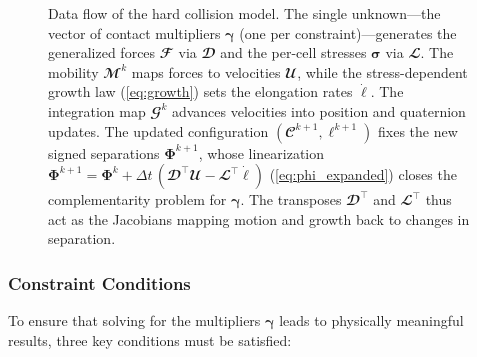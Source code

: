 \documentclass[a4paper,fleqn]{cas-dc}
\begin{document}
\begin{figure}[pos=htbp]
    \caption{Data flow of the hard collision model. The single unknown---the vector of contact multipliers $\boldsymbol{\gamma}$ (one per constraint)---generates the generalized forces $\mathbfcal{F}$ via $\mathbfcal{D}$ and the per-cell stresses $\boldsymbol{\sigma}$ via $\mathbfcal{L}$. The mobility $\mathbfcal{M}^k$ maps forces to velocities $\mathbfcal{U}$, while the stress-dependent growth law (\autoref{eq:growth}) sets the elongation rates $\dot{\boldsymbol{\ell}}$. The integration map $\mathbfcal{G}^k$ advances velocities into position and quaternion updates. The updated configuration $(\mathbfcal{C}^{k+1},\boldsymbol{\ell}^{k+1})$ fixes the new signed separations $\mathbf{\Phi}^{k+1}$, whose linearization $\mathbf{\Phi}^{k+1}=\mathbf{\Phi}^{k}+\Delta t\,(\mathbfcal{D}^\top\mathbfcal{U}-\mathbfcal{L}^\top\dot{\boldsymbol{\ell}})$ (\autoref{eq:phi_expanded}) closes the complementarity problem for $\boldsymbol{\gamma}$. The transposes $\mathbfcal{D}^\top$ and $\mathbfcal{L}^\top$ thus act as the Jacobians mapping motion and growth back to changes in separation.}
    \label{fig:matrix_flow}
\end{figure}

\subsubsection{Constraint Conditions}

To ensure that solving for the multipliers $\boldsymbol{\gamma}$ leads to physically meaningful results, three key conditions must be satisfied:
\end{document}
